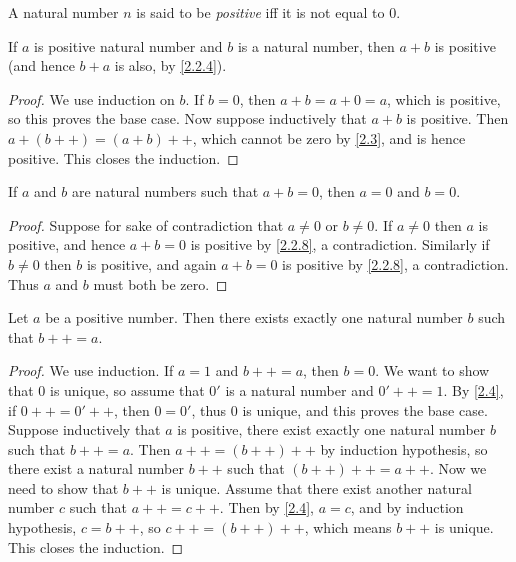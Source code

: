 \begin{definition}\label{2.2.7}
  A natural number \(n\) is said to be \emph{positive} iff it is not equal to \(0\).
\end{definition}

\begin{proposition}\label{2.2.8}
  If \(a\) is positive natural number and \(b\) is a natural number, then \(a + b\) is positive (and hence \(b + a\) is also, by \cref{2.2.4}).
\end{proposition}

\begin{proof}
  We use induction on \(b\).
  If \(b = 0\), then \(a + b = a + 0 = a\), which is positive, so this proves the base case.
  Now suppose inductively that \(a + b\) is positive.
  Then \(a + (b++) = (a + b)++\), which cannot be zero by \cref{2.3}, and is hence positive.
  This closes the induction.
\end{proof}

\begin{corollary}\label{2.2.9}
  If \(a\) and \(b\) are natural numbers such that \(a + b = 0\), then \(a = 0\) and \(b = 0\).
\end{corollary}

\begin{proof}
  Suppose for sake of contradiction that \(a \neq 0\) or \(b \neq 0\).
  If \(a \neq 0\) then \(a\) is positive, and hence \(a + b = 0\) is positive by \cref{2.2.8}, a contradiction.
  Similarly if \(b \neq 0\) then \(b\) is positive, and again \(a + b = 0\) is positive by \cref{2.2.8}, a contradiction.
  Thus \(a\) and \(b\) must both be zero.
\end{proof}

\begin{lemma}\label{2.2.10}
  Let \(a\) be a positive number.
  Then there exists exactly one natural number \(b\) such that \(b++ = a\).
\end{lemma}

\begin{proof}
  We use induction.
  If \(a = 1\) and \(b++ = a\), then \(b = 0\).
  We want to show that \(0\) is unique, so assume that \(0'\) is a natural number and \(0'++ = 1\).
  By \cref{2.4}, if \(0++ = 0'++\), then \(0 = 0'\), thus \(0\) is unique, and this proves the base case.
  Suppose inductively that \(a\) is positive, there exist exactly one natural number \(b\) such that \(b++ = a\).
  Then \(a++ = (b++)++\) by induction hypothesis, so there exist a natural number \(b++\) such that \((b++)++ = a++\).
  Now we need to show that \(b++\) is unique.
  Assume that there exist another natural number \(c\) such that \(a++ = c++\).
  Then by \cref{2.4}, \(a = c\), and by induction hypothesis, \(c = b++\), so \(c++ = (b++)++\), which means \(b++\) is unique.
  This closes the induction.
\end{proof}

